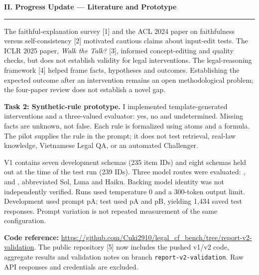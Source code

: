 \documentclass[12pt,a4paper]{article}
\newcommand{\heading}[1]{\textbf{#1}\par\nobreak\vspace{2pt}\hrule\vspace{4pt}}
\begin{document}
\newpage
\begin{mdframed}[style=vinframe]
\heading{II. Progress Update --- Literature and Prototype}
The faithful-explanation survey [1] and the ACL 2024 paper on faithfulness versus self-consistency [2] motivated cautious claims about input-edit tests. The ICLR 2025 paper, \textit{Walk the Talk?} [3], informed concept-editing and quality checks, but does not establish validity for legal interventions. The legal-reasoning framework [4] helped frame facts, hypotheses and outcomes. Establishing the expected outcome after an intervention remains an open methodological problem; the four-paper review does not establish a novel gap.

\textbf{Task 2: Synthetic-rule prototype.} I implemented template-generated interventions and a three-valued evaluator: yes, no and undetermined. Missing facts are unknown, not false. Each rule is formalized using atoms and a formula. The pilot supplies the rule in the prompt; it does not test retrieval, real-law knowledge, Vietnamese Legal QA, or an automated Challenger.

V1 contains seven development schemas (235 item IDs) and eight schemas held out at the time of the test run (239 IDs). Three model routes were evaluated: ,  and , abbreviated Sol, Luna and Haiku. Backing model identity was not independently verified. Runs used temperature 0 and a 300-token output limit. Development used prompt pA; test used pA and pB, yielding 1,434 saved test responses. Prompt variation is not repeated measurement of the same configuration.

\textbf{Code reference:} \url{https://github.com/Cuki2910/legal_cf_bench/tree/report-v2-validation}. The public repository [5] now includes the pushed v1/v2 code, aggregate results and validation notes on branch \texttt{report-v2-validation}. Raw API responses and credentials are excluded.

\end{mdframed}
\newpage
\end{document}
